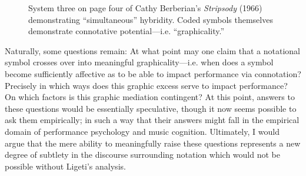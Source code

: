         \begin{figure}
            \centering
            \captionsetup{width=.5\textwidth}
            \caption[System three on page four of Cathy Berberian's \textit{Stripsody} (1966) demonstrating ``simultaneous'' hybridity. Coded symbols themselves demonstrate connotative potential---i.e. ``graphicality.'']{System three on page four of Cathy Berberian's \textit{Stripsody} (1966) demonstrating ``simultaneous'' hybridity. Coded symbols themselves demonstrate connotative potential---i.e. ``graphicality.''\footnotemark}
            \label{fig:stripsody1}
        \end{figure}

    Naturally, some questions remain: At what point may one claim that a notational symbol crosses over into meaningful graphicality---i.e. when does a symbol become sufficiently affective as to be able to impact performance via connotation? Precisely in which ways does this graphic excess serve to impact performance? On which factors is this graphic mediation contingent? At this point, answers to these questions would be essentially speculative, though it now seems possible to ask them empirically; in such a way that their answers might fall in the empirical domain of performance psychology and music cognition. Ultimately, I would argue that the mere ability to meaningfully raise these questions represents a new degree of subtlety in the discourse surrounding notation which would not be possible without Ligeti's analysis.


    

